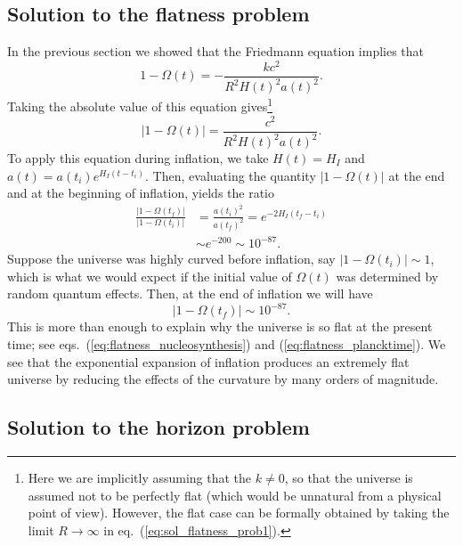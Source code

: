\documentclass[11pt, a4paper,oneside,openright]{book}
\numberwithin{equation}{section}
\begin{document}
\subsection{Solution to the flatness problem}

In the previous section we showed that the Friedmann equation implies that
\begin{equation}
1-\Omega(t)=-\frac{kc^2}{R^2H(t)^2a(t)^2}.
\end{equation}
Taking the absolute value of this equation gives\footnote{Here we are implicitly assuming that the $k\neq0$, so that the universe is assumed not to be perfectly flat (which would be unnatural from a physical point of view). However, the flat case can be formally obtained by taking the limit $R\to\infty$ in eq.\ (\ref{eq:sol_flatness_prob1}).}
\begin{equation} \label{eq:sol_flatness_prob1}
|1-\Omega(t)|=\frac{c^2}{R^2H(t)^2a(t)^2}.
\end{equation}
To apply this equation during inflation, we take $H(t)=H_I$ and $a(t)=a(t_i)e^{H_I(t-t_i)}$. Then, evaluating the quantity $|1-\Omega(t)|$ at the end and at the beginning of inflation, yields the ratio
\begin{equation}
\begin{split}
\frac{|1-\Omega(t_f)|}{|1-\Omega(t_i)|}&=\frac{a(t_i)^2}{a(t_f)^2}=e^{-2H_I(t_f-t_i)}\\
&\sim e^{-200}\sim 10^{-87}.
\end{split}
\end{equation}
Suppose the universe was highly curved before inflation, say $|1-\Omega(t_i)|\sim 1$, which is what we would expect if the initial value of $\Omega(t)$ was determined by random quantum effects. Then, at the end of inflation we will have
\begin{equation}
|1-\Omega(t_f)|\sim 10^{-87}.
\end{equation}
This is more than enough to explain why the universe is so flat at the present time; see eqs.\ (\ref{eq:flatness_nucleosynthesis}) and (\ref{eq:flatness_plancktime}). We see that the exponential expansion of inflation produces an extremely flat universe by reducing the effects of the curvature by many orders of magnitude.

\subsection{Solution to the horizon problem}
\end{document}
